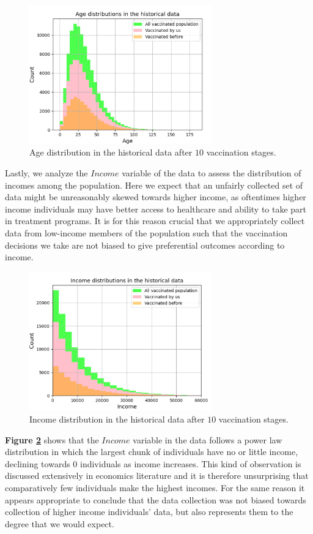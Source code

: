 \documentclass{article}
\begin{document}
\begin{figure}[H]
    \centering
    \includegraphics[height=6cm]{hd_age_dist_version2.png}
    \caption{Age distribution in the historical data after $10$ vaccination stages.}
    \label{hd_age_dist}
\end{figure}


Lastly, we analyze the $Income$ variable of the data to assess the distribution of incomes among the population. Here we expect that an unfairly collected set of data might be unreasonably skewed towards higher income, as oftentimes higher income individuals may have better access to healthcare and ability to take part in treatment programs. It is for this reason crucial that we appropriately collect data from low-income members of the population such that the vaccination decisions we take are not biased to give preferential outcomes according to income.

\begin{figure}[H]
    \centering
    \includegraphics[height=6cm]{hd_income_dist_version2.png}
    \caption{Income distribution in the historical data after $10$ vaccination stages.}
    \label{hd_income_dist}
\end{figure}

\textbf{Figure \ref{hd_income_dist}} shows that the $Income$ variable in the data follows a power law distribution in which the largest chunk of individuals have no or little income, declining towards $0$ individuals as income increases. This kind of observation is discussed extensively in economics literature \textcolor{blue}{\cite{gabaix2016power}} and it is therefore unsurprising that comparatively few individuals make the highest incomes. For the same reason it appears appropriate to conclude that the data collection was not biased towards collection of higher income individuals' data, but also represents them to the degree that we would expect.
\end{document}
